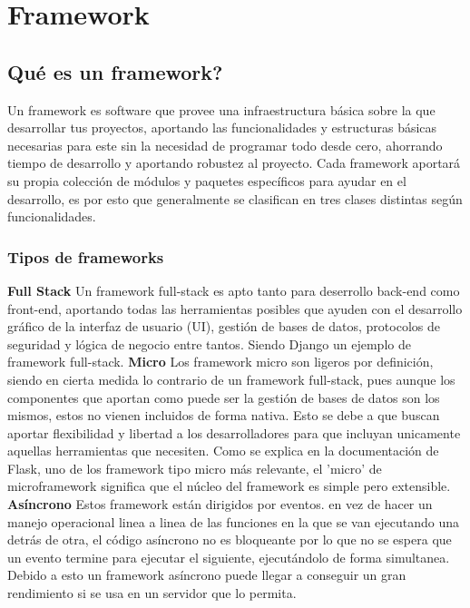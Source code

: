 \section{Framework}

\subsection{Qué es un framework?}
Un framework es software que provee una infraestructura básica sobre la que desarrollar tus proyectos, aportando las funcionalidades y estructuras básicas necesarias para este sin la necesidad de programar todo desde cero, ahorrando tiempo de desarrollo y aportando robustez al proyecto.
\newline
\newline
Cada framework aportará su propia colección de módulos y paquetes específicos para ayudar en el desarrollo, es por esto que generalmente se clasifican en tres clases distintas según funcionalidades.

\subsubsection{Tipos de frameworks}
\textbf{Full Stack}
\newline
Un framework full-stack es apto tanto para deserrollo back-end como front-end, aportando todas las herramientas posibles que ayuden con el desarrollo gráfico de la interfaz de usuario (UI), gestión de bases de datos, protocolos de seguridad y lógica de negocio entre tantos. Siendo Django un ejemplo de framework full-stack. 
\newline
\newline
\textbf{Micro}
\newline
Los framework micro son ligeros por definición, siendo en cierta medida lo contrario de un framework full-stack, pues aunque los componentes que aportan como puede ser la gestión de bases de datos son los mismos, estos no vienen incluidos de forma nativa. Esto se debe a que buscan aportar flexibilidad y libertad a los desarrolladores para que incluyan unicamente aquellas herramientas que necesiten. 
\newline
\newline
Como se explica en la documentación de Flask, uno de los framework tipo micro más relevante, el 'micro' de microframework significa que el núcleo del framework es simple pero extensible.
\newline
\newline
\textbf{Asíncrono}
\newline
Estos framework están dirigidos por eventos. en vez de hacer un manejo operacional linea a linea de las funciones en la que se van ejecutando una detrás de otra, el código asíncrono no es bloqueante por lo que no se espera que un evento termine para ejecutar el siguiente, ejecutándolo de forma simultanea. Debido a esto un framework asíncrono puede llegar a conseguir un gran rendimiento si se usa en un servidor que lo permita.

